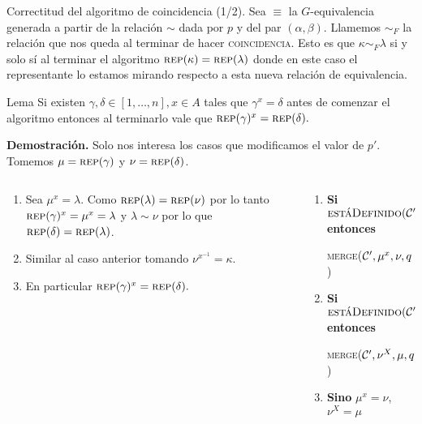 \documentclass[aspectratio=169, 9pt]{beamer}
\newcommand{\rep}{\textsc{rep}}
\newcommand{\coin}{\textsc{coincidencia}}
\newcommand{\mer}{\textsc{merge}}
\newcommand{\edeff}{\textsc{estáDefinido}}
\newcommand{\In}{[1 \dots n]}
\newcommand{\Co}{{\cal{C}}}
\begin{document}
\begin{frame}[fragile]{Correctitud del algoritmo de coincidencia (1/2).}
	Sea $\equiv$ la $G$-equivalencia generada a partir de la relación $\sim$ dada por $p$ y del par $(\alpha, \beta)$.
	\pause
	Llamemos $\sim_F$ la relación que nos queda al terminar de hacer \coin.
	Esto es que $\kappa \sim_F \lambda$ si y solo sí al terminar el algoritmo $\rep (\kappa) = \rep(\lambda)$ donde en este caso el representante lo estamos mirando respecto a esta nueva relación de equivalencia.
	\pause
	
	\begin{alertblock}{Lema}
		Si existen $\gamma, \delta \in [1,\dots,n], x \in A$ tales que $\gamma^x = \delta$ antes de comenzar el algoritmo entonces al terminarlo vale que $\rep(\gamma)^x = \rep(\delta).$
	\end{alertblock}
	\pause
	\textbf{Demostración.} 
	\pause
	Solo nos interesa los casos que modificamos el valor de $p'$. 
	Tomemos $\mu = \rep(\gamma) $ y $\nu = \rep(\delta)$.
	\pause
	\begin{columns}
		\begin{column}{0.5\textwidth}
			\begin{enumerate}
				\item Sea $\mu^x = \lambda$. 
				Como $\rep (\lambda) = \rep (\nu)$ por lo tanto $\rep(\gamma)^x = \mu^x = \lambda $ y $\lambda \sim \nu $ por lo que $ \rep(\delta) = \rep (\lambda)$.
				\item Similar al caso anterior tomando $\nu^{x^{-1}} = \kappa$.
				\item En particular $\rep(\gamma)^x = \rep(\delta).$
			\end{enumerate}
		\end{column}
		\begin{column}{0.5\textwidth}  %
			\begin{enumerate}
				\item  \textbf{Si} $\edeff(\Co', \mu, x)$ \textbf{entonces}
				
				 \mer($\Co', \mu^x, \nu, q$) 
				\item  \textbf{Si} $\edeff(\Co', \nu, X)$  \textbf{entonces}
				
				  \mer($\Co', \nu^X, \mu, q$)
				\item \textbf{Sino} $\mu^x = \nu$, $\nu^X = \mu$ 
			\end{enumerate}
		\end{column}
	\end{columns}
\end{frame}
\end{document}
